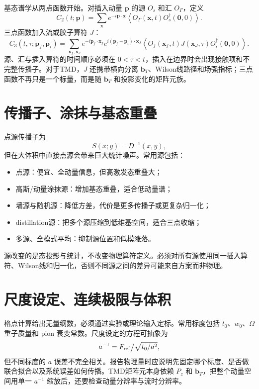 \documentclass[UTF8,12pt,a4paper,twoside,openany]{ctexbook}
\newcommand{\bT}{\boldsymbol b_T}
\begin{document}
基态谱学从两点函数开始。对插入动量 \(\mathbf p\) 的源 \(O_s\) 和汇 \(O_\Gamma\)，定义
\begin{equation}
  C_2(t;\mathbf p)
  =\sum_{\mathbf x}e^{-i\mathbf p\cdot\mathbf x}
  \left\langle O_\Gamma(\mathbf x,t)O_s^\dagger(\mathbf 0,0)\right\rangle .
  \label{eq:lattice-two-point}
\end{equation}
三点函数加入流或胶子算符 \(J\)：
\begin{equation}
  C_3(t,\tau;\mathbf p_f,\mathbf p_i)
  =\sum_{\mathbf x_f,\mathbf x_J}
  e^{-i\mathbf p_f\cdot\mathbf x_f}
  e^{i(\mathbf p_f-\mathbf p_i)\cdot\mathbf x_J}
  \left\langle O_f(\mathbf x_f,t)J(\mathbf x_J,\tau)
  O_i^\dagger(\mathbf 0,0)\right\rangle .
  \label{eq:lattice-three-point}
\end{equation}
源、汇与插入算符的时间顺序必须在 \(0<\tau<t\)，插入在边界时会出现接触项和不完整传播子。对于TMD，\(J\) 还携带横向分离 \(\bT\)、Wilson线路径和场强指标；三点函数不再只是一个标量，而是随 \(\bT\) 和投影变化的矩阵元族。

\section{传播子、涂抹与基态重叠}

点源传播子为
\begin{equation}
  S(x;y)=D^{-1}(x,y),
  \label{eq:propagator-def}
\end{equation}
但在大体积中直接点源会带来巨大统计噪声。常用源包括：
\begin{itemize}
  \item 点源：便宜、全动量信息，但高激发态重叠大；
  \item 高斯/动量涂抹源：增加基态重叠，适合低动量谱；
  \item 墙源与随机源：降低方差，代价是更多传播子或更复杂归一化；
  \item distillation源：把多个源压缩到低维基空间，适合三点收缩；
  \item 多源、全模式平均：抑制源位置和低模涨落。
\end{itemize}
源改变的是态投影与统计，不改变物理算符定义。必须对所有源使用同一插入算符、Wilson线和归一化，否则不同源之间的差异可能来自方案而非物理。

\section{尺度设定、连续极限与体积}

格点计算给出无量纲数，必须通过实验或理论输入定标。常用标度包括 \(t_0\)、\(w_0\)、\(\Omega\) 重子质量和 pion 衰变常数。尺度设定的方程可抽象为
\begin{equation}
  a^{-1}=F_{\rm ref}\big/\sqrt{t_0/a^2},
  \label{eq:scale-setting}
\end{equation}
但不同标度的 \(a\) 误差不完全相关。报告物理量时应说明先固定哪个标度、是否做联合拟合以及系统误差如何传播。TMD矩阵元本身依赖 \(P_z\) 和 \(\bT\)，把整个动量空间用单一 \(a^{-1}\) 缩放后，还要检查动量分辨率与流时分辨率。
\end{document}
